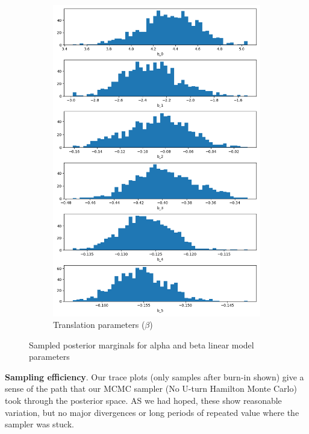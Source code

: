 \documentclass{article}
\begin{document}
\begin{figure}[H]
\begin{subfigure}[b]{0.49\linewidth}
            \includegraphics[width=\linewidth]{figs/bayes_beta_sampled_histogram.png}
            \caption{Translation parameters ($\beta$)}
        \end{subfigure}
        \caption{Sampled posterior marginals for alpha and beta linear model parameters}
        \label{fig:bayeshist}
    \end{figure}

\textbf{Sampling efficiency}. Our trace plots (only samples after burn-in shown) give a sense of the path that our MCMC sampler (No U-turn Hamilton Monte Carlo) took through the posterior space. AS we had hoped, these show reasonable variation, but no major divergences or long periods of repeated value where the sampler was stuck.
\end{document}

